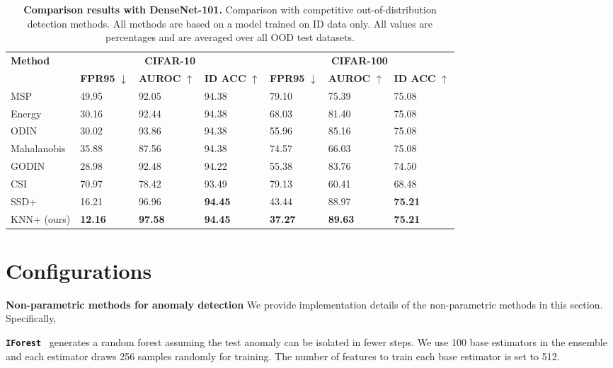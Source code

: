 \documentclass[nohyperref]{article}
\theoremstyle{plain}
\theoremstyle{definition}
\theoremstyle{remark}
\begin{document}
\begin{table*}[b] 
\centering
\vspace{-0.3cm}
\caption[]{\small \textbf{Comparison results with DenseNet-101.} Comparison with competitive out-of-distribution detection methods. All methods are based on a model trained on {ID data only}.  All values are percentages and are averaged over all OOD test datasets.}
\footnotesize
\begin{tabular}{l|lll|lll}
\toprule
\multirow{2}{*}{\textbf{Method}}  & \multicolumn{3}{c|}{\textbf{CIFAR-10}} & \multicolumn{3}{c}{\textbf{CIFAR-100}} \\
  & \textbf{FPR95} $\downarrow$ & \textbf{AUROC} $\uparrow$ & \textbf{ID ACC} $\uparrow$ & \textbf{FPR95} $\downarrow$ & \textbf{AUROC} $\uparrow$ & \textbf{ID ACC} $\uparrow$ \\ \midrule
MSP & 49.95 & 92.05 & 94.38 & 79.10 & 75.39 & 75.08 \\ 
Energy & 30.16 & 92.44 & 94.38 & 68.03 & 81.40 & 75.08 \\ 
ODIN & 30.02 & 93.86 & 94.38 & 55.96 & 85.16 & 75.08 \\ 
Mahalanobis & 35.88 & 87.56 & 94.38 & 74.57 & 66.03 & 75.08 \\ 
GODIN & 28.98 & 92.48 & 94.22 & 55.38 & 83.76 & 74.50 \\ 
CSI & 70.97 & 78.42 & 93.49 & 79.13 & 60.41 & 68.48 \\ 
SSD+ & 16.21 & 96.96 &  \textbf{94.45} &  43.44 & 88.97  &  \textbf{75.21}\\ 
KNN+ (ours) & \textbf{12.16} & \textbf{97.58} & \textbf{94.45}  & \textbf{37.27} & \textbf{89.63} & \textbf{75.21} \\
  \bottomrule
\end{tabular}
        \vspace{-0.2cm}
        \label{tab:other-arc}
\end{table*}


\vspace{-1cm}
\section{Configurations}
\label{sec:config}

\textbf{Non-parametric methods for anomaly detection} We provide implementation details of the non-parametric methods in this section. Specifically,

\texttt{\textbf{IForest}}~\citep{liu2008iforest} generates a random forest assuming the test anomaly can be isolated in fewer steps. We use 100 base estimators in the ensemble and each estimator draws 256 samples randomly for training. The number of features to train each base estimator is set to 512.   
\end{document}

